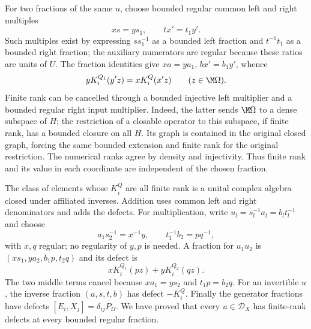 For two fractions of the same $u$, choose bounded regular common left and right multiples
\[
 xs=ys_1,\qquad tx'=t_1y'.
\]
Such multiples exist by expressing $ss_1^{-1}$ as a bounded left fraction and $t^{-1}t_1$ as a bounded right fraction; the auxiliary numerators are regular because these ratios are units of $U$.
The fraction identities give $xa=ya_1$, $bx'=b_1y'$, whence
\begin{equation}\label{eq:common-defect}
 yK_i^{Q_1}(y'z)=xK_i^Q(x'z)\qquad(z\in\M\Omega).
\end{equation}
Finite rank can be cancelled through a bounded injective left multiplier and a bounded regular right input multiplier.
Indeed, the latter sends $\M\Omega$ to a dense subspace of $H$; the restriction of a closable operator to this subspace, if finite rank, has a bounded closure on all $H$.
Its graph is contained in the original closed graph, forcing the same bounded extension and finite rank for the original restriction.
The numerical ranks agree by density and injectivity.
Thus finite rank and its value in each coordinate are independent of the chosen fraction.

The class of elements whose $K_i^Q$ are all finite rank is a unital complex algebra closed under affiliated inverses.
Addition uses common left and right denominators and adds the defects.
For multiplication, write $u_l=s_l^{-1}a_l=b_lt_l^{-1}$ and choose
\[
 a_1s_2^{-1}=x^{-1}y,\qquad t_1^{-1}b_2=pq^{-1},
\]
with $x,q$ regular; no regularity of $y,p$ is needed.
A fraction for $u_1u_2$ is $(xs_1,ya_2,b_1p,t_2q)$ and its defect is
\[
 xK_i^{Q_1}(pz)+yK_i^{Q_2}(qz).
\]
The two middle terms cancel because $xa_1=ys_2$ and $t_1p=b_2q$.
For an invertible $u$, the inverse fraction $(a,s,t,b)$ has defect $-K_i^Q$.
Finally the generator fractions have defects $[E_i,X_j]=\delta_{ij}P_\Omega$.
We have proved that every $u\in\mathcal D_X$ has finite-rank defects at every bounded regular fraction.

